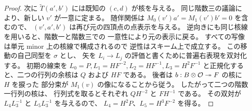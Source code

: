 \begin{proof}
次に $\widetilde T(a',b')$ には既知の $(c,d)$ が核を与える。
同じ階数三の議論により、新しい $v'$ が一意に定まる。
随伴関係は $M_0(v')a'=M_1(v')b'=0$ を含むので、
$(v',a',b')$ は再び元の四頂点の点表示を与える。
逆向きにも同じ核線を用いると、階数一と階数三での
一意性により元の表示に戻る。
すべての写像は単元 minor 上の核線で構成されるので
逆性はスキーム上で成立する。
この移動の自己同型を $\sigma$ とし、
矢を $L_i\to L_j$ の評価と書くために普遍右表現を双対化する。
初期の線束を $L_0=P,L_1=HF^{-2},L_2=HF^{-1},L_3=H^2F^{-1}$
と正規化すると、二つの行列の余核は $Q$ および $HF$ である。
後者は $b:B\otimes\mathcal O\twoheadrightarrow F$ の核に $H$ を捩った
部分束が $M_1(v)$ の像になることから従う。
したがって二つの階数一行列の核は、
行列式を取るとそれぞれ $QH^{-2}$ と $FH^{-1}$ である。
その双対が $L_4L_3^{-1}$ と $L_5L_3^{-1}$ を与えるので、
$L_4=H^2P$、$L_5=H^3F^{-2}$ を得る。


\end{proof}
